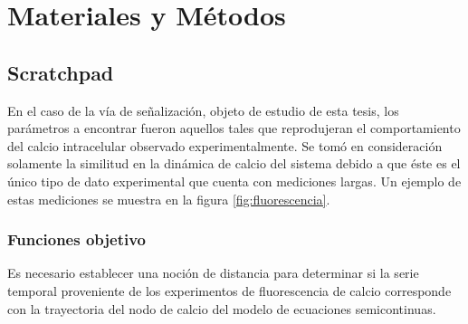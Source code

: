 \chapter{Materiales y M\'etodos}\label{ch:matmet} %

\section{Scratchpad}
En el caso de la vía de señalización, objeto de estudio de esta tesis, los parámetros a encontrar fueron aquellos tales que reprodujeran el comportamiento del calcio intracelular observado experimentalmente. Se tomó en consideración solamente la similitud en la dinámica de calcio del sistema debido a que éste es el único tipo de dato experimental que cuenta con mediciones largas. Un ejemplo de estas mediciones se muestra en la figura \ref{fig:fluorescencia}.


\subsection{Funciones objetivo}

Es necesario establecer una noción de distancia para determinar si la serie temporal proveniente de los experimentos de fluorescencia de calcio corresponde con la trayectoria del nodo de calcio del modelo de ecuaciones semicontinuas.

